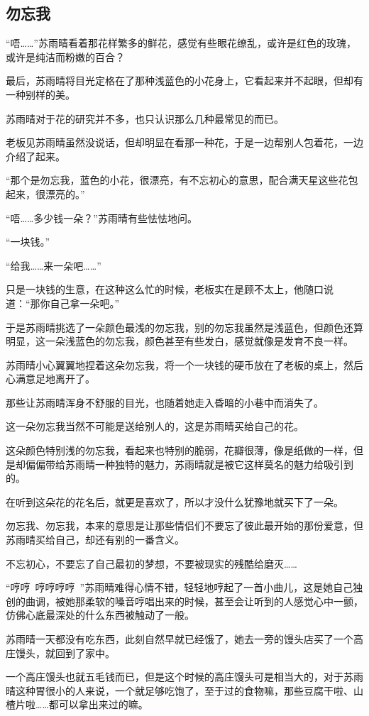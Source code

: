 \subsection{勿忘我}

“唔……”苏雨晴看着那花样繁多的鲜花，感觉有些眼花缭乱，或许是红色的玫瑰，或许是纯洁而粉嫩的百合？

最后，苏雨晴将目光定格在了那种浅蓝色的小花身上，它看起来并不起眼，但却有一种别样的美。

苏雨晴对于花的研究并不多，也只认识那么几种最常见的而已。

老板见苏雨晴虽然没说话，但却明显在看那一种花，于是一边帮别人包着花，一边介绍了起来。

“那个是勿忘我，蓝色的小花，很漂亮，有不忘初心的意思，配合满天星这些花包起来，很漂亮的。”

“唔……多少钱一朵？”苏雨晴有些怯怯地问。

“一块钱。”

“给我……来一朵吧……”

只是一块钱的生意，在这种这么忙的时候，老板实在是顾不太上，他随口说道：“那你自己拿一朵吧。”

于是苏雨晴挑选了一朵颜色最浅的勿忘我，别的勿忘我虽然是浅蓝色，但颜色还算明显，这一朵浅蓝色的勿忘我，颜色甚至有些发白，感觉就像是发育不良一样。

苏雨晴小心翼翼地捏着这朵勿忘我，将一个一块钱的硬币放在了老板的桌上，然后心满意足地离开了。

那些让苏雨晴浑身不舒服的目光，也随着她走入昏暗的小巷中而消失了。

这一朵勿忘我当然不可能是送给别人的，这是苏雨晴买给自己的花。

这朵颜色特别浅的勿忘我，看起来也特别的脆弱，花瓣很薄，像是纸做的一样，但是却偏偏带给苏雨晴一种独特的魅力，苏雨晴就是被它这样莫名的魅力给吸引到的。

在听到这朵花的花名后，就更是喜欢了，所以才没什么犹豫地就买下了一朵。

勿忘我、勿忘我，本来的意思是让那些情侣们不要忘了彼此最开始的那份爱意，但苏雨晴买给自己，却还有别的一番含义。

不忘初心，不要忘了自己最初的梦想，不要被现实的残酷给磨灭……

“哼哼~哼哼哼哼~”苏雨晴难得心情不错，轻轻地哼起了一首小曲儿，这是她自己独创的曲调，被她那柔软的嗓音哼唱出来的时候，甚至会让听到的人感觉心中一颤，仿佛心底最深处的什么东西被触动了一般。

苏雨晴一天都没有吃东西，此刻自然早就已经饿了，她去一旁的馒头店买了一个高庄馒头，就回到了家中。

一个高庄馒头也就五毛钱而已，但是这个时候的高庄馒头可是相当大的，对于苏雨晴这种胃很小的人来说，一个就足够吃饱了，至于过的食物嘛，那些豆腐干啦、山楂片啦……都可以拿出来过的嘛。

